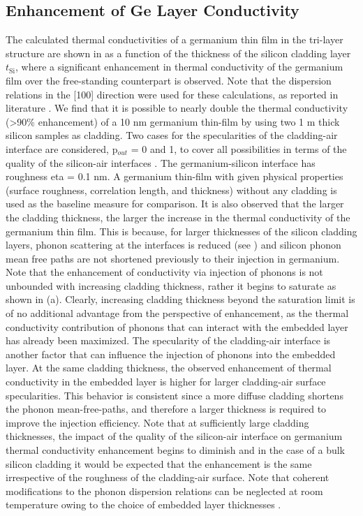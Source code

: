 \subsection{Enhancement of Ge Layer Conductivity}
The calculated thermal conductivities of a germanium thin film in the tri-layer structure are shown in  as a function of the thickness of the silicon cladding layer $t_{\text{Si}}$, where a significant enhancement in thermal conductivity of the germanium film over the free-standing counterpart is observed. Note that the dispersion relations in the [100] direction were used for these calculations, as reported in literature \cite{RN388}. We find that it is possible to nearly double the thermal conductivity (\textgreater90\% enhancement) of a 10 nm germanium thin-film by using two 1 \si{\micro}m thick silicon samples as cladding. Two cases for the specularities of the cladding-air interface are considered, \gls{p}$_{out}$ = 0 and 1, to cover all possibilities in terms of the quality of the silicon-air interfaces \cite{book_Ziman}. The germanium-silicon interface has roughness \gls{eta} = 0.1 nm. A germanium thin-film with given physical properties (surface roughness, correlation length, and thickness) without any cladding is used as the baseline measure for comparison. It is also observed that the larger the cladding thickness, the larger the increase in the thermal conductivity of the germanium thin film. This is because, for larger thicknesses of the silicon cladding layers, phonon scattering at the interfaces is reduced (see ) and silicon phonon mean free paths are not shortened previously to their injection in germanium. Note that the enhancement of conductivity via injection of phonons is not unbounded with increasing cladding thickness, rather it begins to saturate as shown in (a). Clearly, increasing cladding thickness beyond the saturation limit is of no additional advantage from the perspective of enhancement, as the thermal conductivity contribution of phonons that can interact with the embedded layer has already been maximized. The specularity of the cladding-air interface is another factor that can influence the injection of phonons into the embedded layer. At the same cladding thickness, the observed enhancement of thermal conductivity in the embedded layer is higher for larger cladding-air surface specularities. This behavior is consistent since a more diffuse cladding shortens the phonon mean-free-paths, and therefore a larger thickness is required to improve the injection efficiency. Note that at sufficiently large cladding thicknesses, the impact of the quality of the silicon-air interface on germanium thermal conductivity enhancement begins to diminish and in the case of a bulk silicon cladding it would be expected that the enhancement is the same irrespective of the roughness of the cladding-air surface. Note that coherent modifications to the phonon dispersion relations can be neglected at room temperature owing to the choice of embedded layer thicknesses \cite{RN372}.

